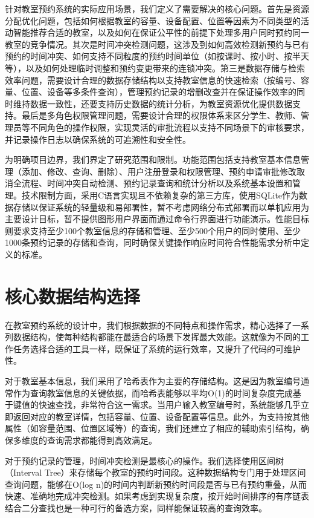 \documentclass[a4paper,12pt,twoside]{ctexrep}
\begin{document}
针对教室预约系统的实际应用场景，我们定义了需要解决的核心问题。首先是资源分配优化问题，包括如何根据教室的容量、设备配置、位置等因素为不同类型的活动智能推荐合适的教室，以及如何在保证公平性的前提下处理多用户同时预约同一教室的竞争情况。其次是时间冲突检测问题，这涉及到如何高效检测新预约与已有预约的时间冲突、如何支持不同粒度的预约时间单位（如按课时、按小时、按半天等），以及如何处理临时调整和预约变更带来的连锁冲突。第三是数据存储与检索效率问题，需要设计合理的数据存储结构以支持教室信息的快速检索（按编号、容量、位置、设备等多条件查询），管理预约记录的增删改查并在保证操作效率的同时维持数据一致性，还要支持历史数据的统计分析，为教室资源优化提供数据支持。最后是多角色权限管理问题，需要设计合理的权限体系来区分学生、教师、管理员等不同角色的操作权限，实现灵活的审批流程以支持不同场景下的审核要求，并记录操作日志以确保系统的可追溯性和安全性。

为明确项目边界，我们界定了研究范围和限制。功能范围包括支持教室基本信息管理（添加、修改、查询、删除）、用户注册登录和权限管理、预约申请审批修改取消全流程、时间冲突自动检测、预约记录查询和统计分析以及系统基本设置和管理。技术限制方面，采用C语言实现且不依赖复杂的第三方库，使用SQLite作为数据存储以保证系统的轻量级和易部署性，暂不考虑网络分布式部署而以单机应用为主要设计目标，暂不提供图形用户界面而通过命令行界面进行功能演示。性能目标则要求支持至少100个教室信息的存储和管理、至少500个用户的同时使用、至少1000条预约记录的存储和查询，同时确保关键操作响应时间符合性能需求分析中定义的标准。

\section*{核心数据结构选择}

在教室预约系统的设计中，我们根据数据的不同特点和操作需求，精心选择了一系列数据结构，使每种结构都能在最适合的场景下发挥最大效能。这就像为不同的工作任务选择合适的工具一样，既保证了系统的运行效率，又提升了代码的可维护性。

对于教室基本信息，我们采用了哈希表作为主要的存储结构。这是因为教室编号通常作为查询教室信息的关键依据，而哈希表能够以平均O(1)的时间复杂度完成基于键值的快速查找，非常符合这一需求。当用户输入教室编号时，系统能够几乎立即返回对应的教室详情，包括容量、位置、设备配置等信息。此外，为支持按其他属性（如容量范围、位置区域等）的查询，我们还建立了相应的辅助索引结构，确保多维度的查询需求都能得到高效满足。

对于预约记录的管理，时间冲突检测是最核心的操作。我们选择使用区间树（Interval Tree）来存储每个教室的预约时间段。这种数据结构专门用于处理区间查询问题，能够在O(log n)的时间内判断新预约时间段是否与已有预约重叠，从而快速、准确地完成冲突检测。如果考虑到实现复杂度，按开始时间排序的有序链表结合二分查找也是一种可行的备选方案，同样能保证较高的查询效率。
\end{document}
